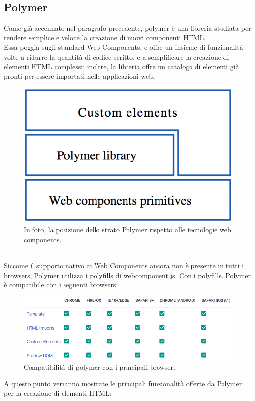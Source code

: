 \subsection{Polymer}
\label{sec:chapter_tecnologie_abilitanti_polymer}
Come già accennato nel paragrafo precedente, polymer è una libreria studiata per rendere semplice e veloce la creazione di nuovi componenti HTML. 
\\
Essa poggia sugli standard Web Components, e offre un insieme di funzionalità volte a ridurre la quantità di codice scritto, e a semplificare la creazione di elementi HTML complessi; inoltre, la libreria offre un catalogo di elementi già pronti per essere importati nelle applicazioni web.
\\
\begin{figure}[htb]
 \centering
 \includegraphics[width=0.4\linewidth]{images/chapter_tecnologie_abilitanti/tecnologie_abilitanti_polymer_stack.png}\hfill
 \caption[Strato Polymer]{In foto, la posizione dello strato Polymer rispetto alle tecnologie web components.}
 \label{fig:tecnologie_abilitanti_polymer_stack}
\end{figure}
\\
Siccome il supporto nativo ai Web Components ancora non è presente in tutti i browsers, Polymer utilizza i polyfills di webcomponent.js. Con i polyfills, Polymer è compatibile con i seguenti browsers:
\\
\begin{figure}[htb]
 \centering
 \includegraphics[width=0.8\linewidth]{images/chapter_tecnologie_abilitanti/tecnologie_abilitanti_poly_comp.png}\hfill
 \caption[Polymer e browser compatibili]{Compatibilità di polymer con i principali browser.}
 \label{fig:tecnologie_abilitanti_poly_comp}
\end{figure}
A questo punto verranno mostrate le principali funzionalità offerte da Polymer per la creazione di elementi HTML:
